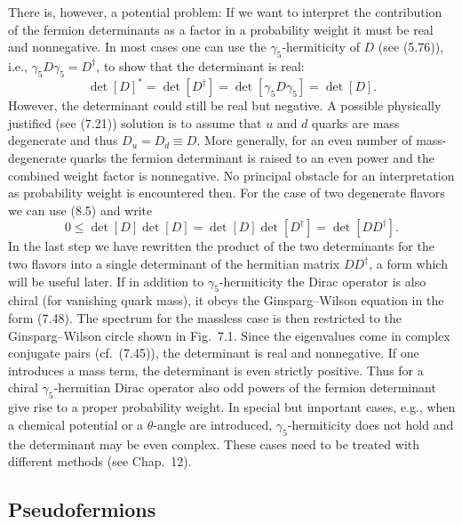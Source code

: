 There is, however, a potential problem: If we want to interpret the contribution
of the fermion determinants as a factor in a probability weight it must be real
and nonnegative. In most cases one can use the $\gamma_5$-hermiticity of $D$
(see (5.76)), i.e., $\gamma_5 D \gamma_5 = D^\dagger$, to show that the
determinant is real:
\begin{equation}
\det[D]^* = \det[D^\dagger] = \det[\gamma_5 D\gamma_5] = \det[D].
\end{equation}
However, the determinant could still be real but negative. A possible
physically justified (see (7.21)) solution is to assume that $u$ and $d$ quarks
are mass degenerate and thus $D_u = D_d \equiv D$. More generally, for an even
number of mass-degenerate quarks the fermion determinant is raised to an even
power and the combined weight factor is nonnegative. No principal obstacle for
an interpretation as probability weight is encountered then. For the case of
two degenerate flavors we can use (8.5) and write
\begin{equation}
0 \le \det[D]\det[D] = \det[D]\det[D^\dagger] = \det[DD^\dagger].
\end{equation}
In the last step we have rewritten the product of the two determinants for the
two flavors into a single determinant of the hermitian matrix $DD^\dagger$, a
form which will be useful later.
If in addition to $\gamma_5$-hermiticity the Dirac operator is also chiral (for
vanishing quark mass), it obeys the Ginsparg--Wilson equation in the form
(7.48). The spectrum for the massless case is then restricted to the
Ginsparg--Wilson circle shown in Fig.~7.1. Since the eigenvalues come in
complex conjugate pairs (cf.\ (7.45)), the determinant is real and nonnegative.
If one introduces a mass term, the determinant is even strictly positive. Thus
for a chiral $\gamma_5$-hermitian Dirac operator also odd powers of the fermion
determinant give rise to a proper probability weight.
In special but important cases, e.g., when a chemical potential or a
$\theta$-angle are introduced, $\gamma_5$-hermiticity does not hold and the
determinant may be even complex. These cases need to be treated with different
methods (see Chap.~12).

\subsection{Pseudofermions}


